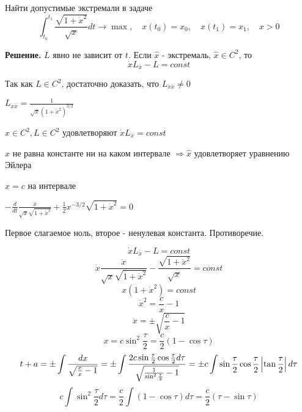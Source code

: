 \begin{task}
    Найти допустимые экстремали в задаче
    $$
    \int_{t_0}^{t_1}\frac{\sqrt{1+\dot{x}^2}}{\sqrt{x}} dt \rightarrow \max ,\quad x(t_0)=x_0,\quad x(t_1)=x_1,\quad x>0
    $$
    
    \textbf{Решение.}
    $L$ явно не зависит от $t$. Если $\hat{x}$ - экстремаль, $\hat{x}\in C^2$, то
    $$
    \dot{x}L_{\dot{x}}-L = const
    $$
    
    Так как $L\in C^2$, достаточно доказать, что $L_{\dot{x}\dot{x}}\neq 0$
    
    $L_{\dot{x}\dot{x}}=\frac{1}{\sqrt{x}(1+\dot{x}^2)^{3/2}}$
    
    $\hat{x}\in C^2, L\in C^2 $ удовлетворяют $\dot{x}L_{\dot{x}} = const$ 
    
    $\hat{x}$ не равна константе ни на каком интервале $\Longrightarrow\hat{x}$ удовлетворяет уравнению Эйлера
    
    $\hat{x}=c$ на интервале
    
    $-\frac{d}{dt}\frac{\dot{x}}{\sqrt{x}\sqrt{1+\dot{x}^2}}+\frac{1}{2}x^{-3/2}\sqrt{1+\dot{x}^2}=0$
    
    Первое слагаемое ноль, второе - ненулевая константа. Противоречие.
    
    $$
    \dot{x}L_{\dot{x}}-L = const
    $$
    $$
    \dot{x}\frac{\dot{x}}{\sqrt{x}\sqrt{1+\dot{x}^2}} - \frac{\sqrt{1+\dot{x}^2}}{\sqrt{x}}=const
    $$
    $$
    x(1+\dot{x}^2)=const
    $$
    $$
    \dot{x}^2=\frac{c}{x}-1
    $$
    $$
    \dot{x}=\pm\sqrt{\frac{c}{x}-1}
    $$
    $$
    x = c\sin^2{\frac{\tau}{2}}=\frac{c}{2}(1-\cos{\tau})
    $$
    $$
    t+a= \pm\int\frac{dx}{\sqrt{\frac{c}{x}-1}} = \pm\int\frac{2c\sin{\frac{\tau}{2}}\cos{\frac{\tau}{2}}d\tau}{\sqrt{\frac{1}{\sin^2{\frac{\tau}{2}}}-1}} = \pm c\int\sin{\frac{\tau}{2}}\cos{\frac{\tau}{2}}\left\lvert\tan{\frac{\tau}{2}}\right\rvert d\tau
    $$
    $$
    c\int\sin^2{\frac{\tau}{2}}d\tau = \frac{c}{2}\int(1-\cos{\tau})d\tau = \frac{c}{2}(\tau-\sin{\tau})
    $$
    
\end{task}

